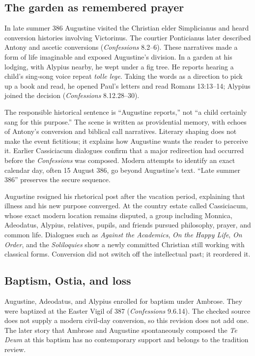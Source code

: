 \subsection{The garden as remembered prayer}

In late summer 386 Augustine visited the Christian elder Simplicianus and
heard conversion histories involving Victorinus. The courtier Ponticianus
later described Antony and ascetic conversions (\emph{Confessions} 8.2--6).
These narratives made a form of life imaginable and exposed Augustine's
division. In a garden at his lodging, with Alypius nearby, he wept under a fig
tree. He reports hearing a child's sing-song voice repeat \emph{tolle lege}.
Taking the words as a direction to pick up a book and read, he opened Paul's letters and
read Romans 13:13--14; Alypius joined the decision
(\emph{Confessions} 8.12.28--30).

The responsible historical sentence is “Augustine reports,” not “a child
certainly sang for this purpose.” The scene is written as providential
memory, with echoes of Antony's conversion and biblical call narratives.
Literary shaping does not make the event fictitious; it explains how Augustine
wants the reader to perceive it. Earlier Cassiciacum dialogues confirm that a
major redirection had occurred before the \emph{Confessions} was composed.
Modern attempts to identify an exact calendar day, often 15 August 386, go
beyond Augustine's text. “Late summer 386” preserves the secure sequence.

Augustine resigned his rhetorical post after the vacation period, explaining
that illness and his new purpose converged. At the country estate called
Cassiciacum, whose exact modern location remains disputed, a group including
Monnica, Adeodatus, Alypius, relatives, pupils, and friends pursued philosophy,
prayer, and common life. Dialogues such as \emph{Against the Academics},
\emph{On the Happy Life}, \emph{On Order}, and the \emph{Soliloquies} show a
newly committed Christian still working with classical forms. Conversion did
not switch off the intellectual past; it reordered it.

\subsection{Baptism, Ostia, and loss}

Augustine, Adeodatus, and Alypius enrolled for baptism under Ambrose. They were
baptized at the Easter Vigil of 387 (\emph{Confessions} 9.6.14). The checked
source does not supply a modern civil-day conversion, so this revision does
not add one. The later story that Ambrose and Augustine spontaneously composed
the \emph{Te Deum} at this baptism has no contemporary support and belongs to
the tradition review.


